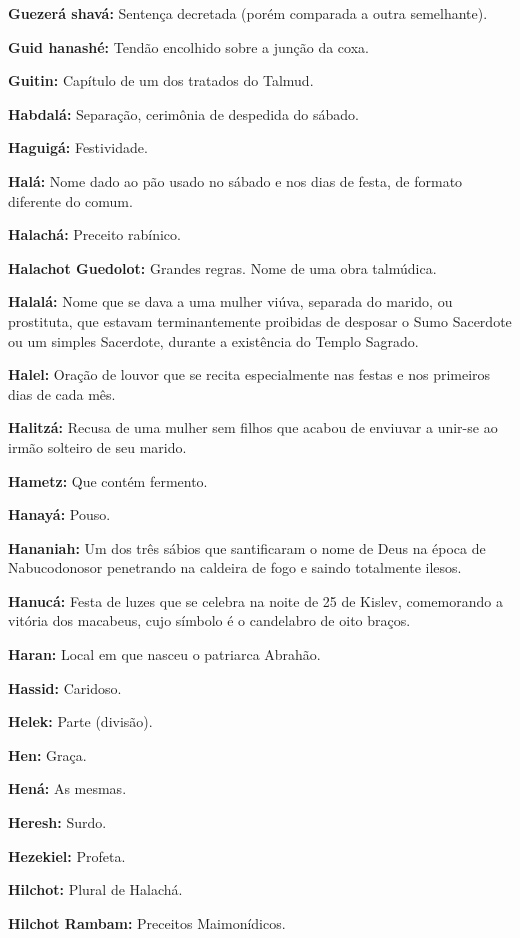 \begin{hangparas}{.25in}{1}
{\textbf{Guezerá shavá:} Sentença decretada (porém comparada a outra semelhante).

\textbf{Guid hanashé:} Tendão encolhido sobre a junção da coxa.

\textbf{Guitin:} Capítulo de um dos tratados do Talmud.

\textbf{Habdalá:} Separação, cerimônia de despedida do sábado.

\textbf{Haguigá:} Festividade.

\textbf{Halá:} Nome dado ao pão usado no sábado e nos dias de festa, de
formato diferente do comum.

\textbf{Halachá:} Preceito rabínico.

\textbf{Halachot Guedolot:} Grandes regras. Nome de uma obra talmúdica.

\textbf{Halalá:} Nome que se dava a uma mulher viúva, separada do
marido, ou prostituta, que estavam terminantemente proibidas de desposar
o Sumo Sacerdote ou um simples Sacerdote, durante a existência do Templo
Sagrado.

\textbf{Halel:} Oração de louvor que se recita especialmente nas
festas e nos primeiros dias de cada mês.

\textbf{Halitzá:} Recusa de uma mulher sem filhos que acabou de
enviuvar a unir-se ao irmão solteiro de seu marido.

\textbf{Hametz:} Que contém fermento.

\textbf{Hanayá:} Pouso.

\textbf{Hananiah:} Um dos três sábios que santificaram o nome de Deus
na época de Nabucodonosor penetrando na caldeira de fogo e saindo
totalmente ilesos.

\textbf{Hanucá:} Festa de luzes que se celebra na noite de 25 de
Kislev, comemorando a vitória dos macabeus, cujo símbolo é o candelabro
de oito braços.

\textbf{Haran:} Local em que nasceu o patriarca Abrahão.

\textbf{Hassid:} Caridoso.

\textbf{Helek:} Parte (divisão).

\textbf{Hen:} Graça.

\textbf{Hená:} As mesmas.

\textbf{Heresh:} Surdo.

\textbf{Hezekiel:} Profeta.

\textbf{Hilchot:} Plural de Halachá.

\textbf{Hilchot Rambam:} Preceitos Maimonídicos.

}
\end{hangparas}

